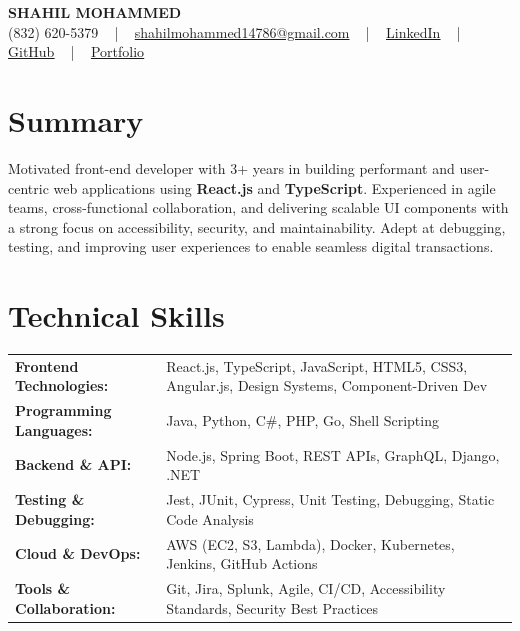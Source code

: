 \documentclass[letterpaper,11pt]{article}
\begin{document}
\begin{center}
    {\fontsize{14pt}{12pt}\selectfont \textbf{\MakeUppercase{Shahil Mohammed}}}\\ \vspace{2pt}
    \fontsize{10pt}{12pt}\selectfont (832) 620-5379 ~ | ~ \href{mailto:shahilmohammed14786@gmail.com}{shahilmohammed14786@gmail.com} ~ | ~  
    \href{https://www.linkedin.com/in/shahil-mohammed-9652931a1/}{\color{blue}\underline{LinkedIn}}  ~ | ~ 
    \href{https://github.com/freakbeast14}{\color{blue}\underline{GitHub}} ~ | ~ 
    \href{https://shahil-mohammed.netlify.app/}{\color{blue}\underline{Portfolio}}
    \vspace{-8pt}
\end{center}

\section{Summary}
\fontsize{9pt}{10pt}\selectfont
Motivated front-end developer with 3+ years in building performant and user-centric web applications using \textbf{React.js} and \textbf{TypeScript}. Experienced in agile teams, cross-functional collaboration, and delivering scalable UI components with a strong focus on accessibility, security, and maintainability. Adept at debugging, testing, and improving user experiences to enable seamless digital transactions.
 \vspace{-5pt}
 
\section{Technical Skills}
        \vspace{-14pt}
        \begin{table}[h]
            \fontsize{9pt}{10pt}\selectfont
            \begin{tabular}{p{0.3\linewidth} p{0.7\linewidth}}
                \textbf{Frontend Technologies:} & React.js, TypeScript, JavaScript, HTML5, CSS3, Angular.js, Design Systems, Component-Driven Dev \\
                \textbf{Programming Languages:} & Java, Python, C\#, PHP, Go, Shell Scripting \\
                \textbf{Backend \& API:} & Node.js, Spring Boot, REST APIs, GraphQL, Django, .NET \\
                \textbf{Testing \& Debugging:} & Jest, JUnit, Cypress, Unit Testing, Debugging, Static Code Analysis \\
                \textbf{Cloud \& DevOps:} & AWS (EC2, S3, Lambda), Docker, Kubernetes, Jenkins, GitHub Actions \\
                \textbf{Tools \& Collaboration:} & Git, Jira, Splunk, Agile, CI/CD, Accessibility Standards, Security Best Practices \\
            \end{tabular}
        \end{table}
 \vspace{-15pt}
 
\end{document}
